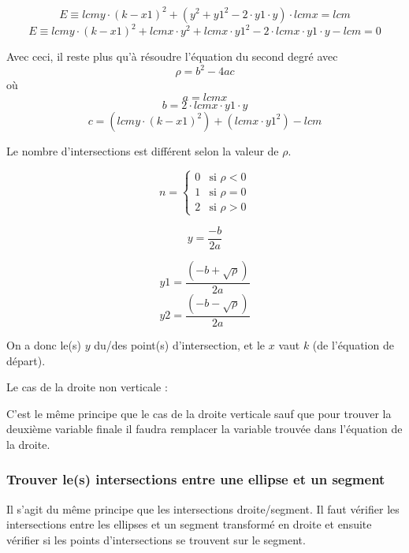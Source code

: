 \documentclass[]{article}
\begin{document}
$$ E \equiv lcmy \cdot (k-x1)^2 + (y^2 + y1^2 - 2 \cdot y1 \cdot y)
\cdot lcmx = lcm$$
$$ E \equiv lcmy \cdot (k-x1)^2 + lcmx \cdot y^2 + lcmx \cdot
y1^2 - 2 \cdot lcmx \cdot y1 \cdot y - lcm = 0 $$

Avec ceci, il reste plus qu'à résoudre l'équation du second degré 
avec 
$$ \rho = b^2 - 4ac$$
où $$ a = lcmx $$
$$ b = 2 \cdot lcmx \cdot y1 \cdot y $$
$$ c = (lcmy \cdot (k-x1)^2) + (lcmx \cdot y1^2) - lcm $$



Le nombre d'intersections est différent selon la valeur de $\rho$.

\[
	n =
	\begin{cases}
		0 & \text{si } \rho < 0 \\
		1 & \text{si } \rho = 0 \\
		2 & \text{si } \rho > 0  
	\end{cases}
\]

$$ y = \frac {-b}{2a} $$

$$ y1 = \frac{(-b + \sqrt{\rho})}{2a} $$
$$ y2 = \frac{(-b - \sqrt{\rho})}{2a} $$

On a donc le(s) $y$ du/des point(s) d'intersection, et le $x$
vaut $k$ (de l'équation de départ).



Le cas de la droite non verticale : 


C'est le même principe que le cas de la droite verticale sauf
que pour trouver la deuxième variable finale il faudra
remplacer la variable trouvée dans l'équation de la droite.

\subsubsection{Trouver le(s) intersections entre une ellipse et un segment}

Il s'agit du même principe que les intersections droite/segment.
Il faut vérifier les intersections entre les ellipses et un segment
transformé en droite et ensuite vérifier si les points d'intersections
se trouvent sur le segment.
\end{document}
